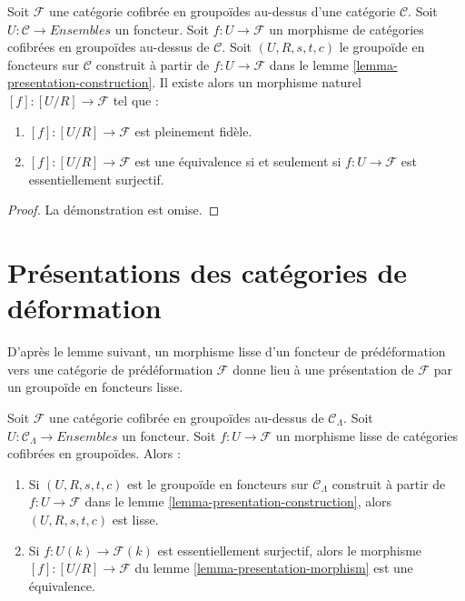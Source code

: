 \begin{lemma}
\label{lemma-presentation-morphism}
Soit $\mathcal{F}$ une catégorie cofibrée en groupoïdes au-dessus d'une
catégorie $\mathcal{C}$. Soit $U : \mathcal{C} \to \textit{Ensembles}$ un
foncteur. Soit $f : U \to \mathcal{F}$ un morphisme de catégories cofibrées
en groupoïdes au-dessus de $\mathcal{C}$. Soit $(U, R, s, t, c)$ le groupoïde
en foncteurs sur $\mathcal{C}$ construit à partir de
$f : U \to \mathcal{F}$ dans le lemme
\ref{lemma-presentation-construction}. Il existe alors un morphisme naturel
$[f] : [U/R] \to \mathcal{F}$ tel que :
\begin{enumerate}
\item $[f]: [U/R] \to \mathcal{F}$ est pleinement fidèle.
\item $[f]: [U/R] \to \mathcal{F}$ est une équivalence si et seulement si
$f : U \to \mathcal{F}$ est essentiellement surjectif.
\end{enumerate}
\end{lemma}

\begin{proof}
La démonstration est omise.
\end{proof}







\section{Présentations des catégories de déformation}
\label{section-presentation-deformation-categories}

\noindent
D'après le lemme suivant, un morphisme lisse d'un foncteur de prédéformation
vers une catégorie de prédéformation $\mathcal{F}$ donne lieu à une
présentation de $\mathcal{F}$ par un groupoïde en foncteurs lisse.

\begin{lemma}
\label{lemma-smooth-groupoid-in-functors-construction}
Soit $\mathcal{F}$ une catégorie cofibrée en groupoïdes au-dessus de
$\mathcal{C}_\Lambda$. Soit $U : \mathcal{C}_\Lambda \to \textit{Ensembles}$ un
foncteur. Soit $f : U \to \mathcal{F}$ un morphisme lisse de catégories
cofibrées en groupoïdes. Alors :
\begin{enumerate}
\item Si $(U, R, s, t, c)$ est le groupoïde en foncteurs sur
$\mathcal{C}_\Lambda$ construit à partir de $f : U \to \mathcal{F}$ dans le
lemme \ref{lemma-presentation-construction}, alors $(U, R, s, t, c)$ est
lisse.
\item Si $f : U(k) \to \mathcal{F}(k)$ est essentiellement surjectif, alors le
morphisme $[f] : [U/R] \to \mathcal{F}$ du lemme
\ref{lemma-presentation-morphism} est une équivalence.
\end{enumerate}
\end{lemma}

